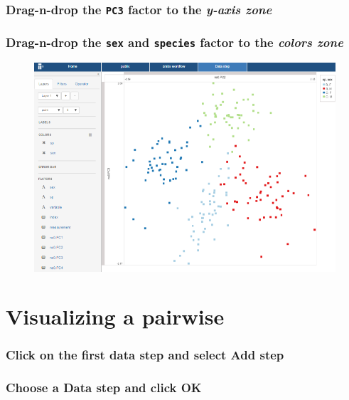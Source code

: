\documentclass[]{book}
\theoremstyle{definition}
\theoremstyle{definition}
\theoremstyle{remark}
\begin{document}
\subsubsection{\texorpdfstring{Drag-n-drop the \texttt{PC3} factor to
the \emph{y-axis
zone}}{Drag-n-drop the PC3 factor to the y-axis zone}}\label{drag-n-drop-the-pc3-factor-to-the-y-axis-zone}

\subsubsection{\texorpdfstring{Drag-n-drop the \texttt{sex} and
\texttt{species} factor to the \emph{colors
zone}}{Drag-n-drop the sex and species factor to the colors zone}}\label{drag-n-drop-the-sex-and-species-factor-to-the-colors-zone}

\begin{figure}[htbp]
\centering
\includegraphics{images/projection_pca.png}
\caption{}
\end{figure}

\section{Visualizing a pairwise}\label{visualizing-a-pairwise}

\subsubsection{\texorpdfstring{Click on the first data step and select
\textbf{Add
step}}{Click on the first data step and select Add step}}\label{click-on-the-first-data-step-and-select-add-step}

\subsubsection{\texorpdfstring{Choose a \textbf{Data step} and click
\textbf{OK}}{Choose a Data step and click OK}}\label{choose-a-data-step-and-click-ok-1}
\end{document}
